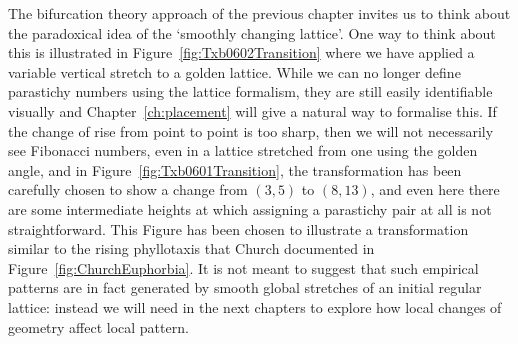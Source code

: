 The bifurcation theory approach of the previous chapter invites us to think about the paradoxical idea of the `smoothly changing lattice'.
One way to think about this is illustrated in Figure~\ref{fig:Txb0602Transition} where we have applied a  variable vertical stretch to a golden lattice.
While we can no longer define parastichy numbers using the lattice formalism, they are still easily identifiable visually and Chapter~\ref{ch:placement} will give a natural way to formalise this. 
%
%
%
If the change of rise from point to point is too sharp, 
then we will not necessarily see Fibonacci numbers, even in a lattice stretched from one using the golden angle, and in Figure~\ref{fig:Txb0601Transition}, the transformation has been carefully chosen to show a change from  $(3,5)$ to $(8,13)$, and even here there are some intermediate heights at which assigning a parastichy pair at all is not straightforward. 
This Figure has been chosen to illustrate a transformation similar to the 
 rising phyllotaxis that Church documented in Figure~\ref{fig:ChurchEuphorbia}. It is not meant to suggest that such empirical patterns are in fact generated by smooth global stretches of an initial regular lattice: instead we will need in the next chapters to explore how local changes of geometry affect local pattern.  



